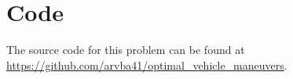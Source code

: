 \section{Code}

The source code for this problem can be found at \newline \href{https://github.com/arvba41/optimal_vehicle_maneuvers/tree/main/uppgift/ugf2}{https://github.com/arvba41/optimal\_vehicle\_maneuvers}.



